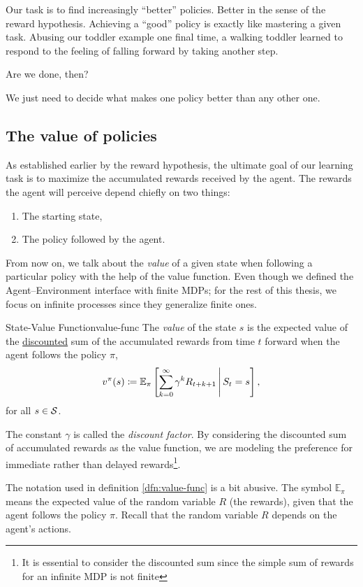 Our task is to find increasingly ``better'' policies. Better in the sense of the
reward hypothesis. Achieving a ``good'' policy is exactly like mastering a given
task. Abusing our toddler example one final time, a walking toddler learned to
respond to the feeling of falling forward by taking another step.

Are we done, then? 

We just need to decide what makes one policy better than any other one.

\subsection{The value of policies}
As established earlier by the reward hypothesis, the ultimate goal of our
learning task is to maximize the accumulated rewards received by the agent. The
rewards the agent will perceive depend chiefly on two things:
\begin{enumerate}
	\item The starting state,
	\item The policy followed by the agent.
\end{enumerate}

From now on, we talk about the \textit{value} of a given state when following a
particular policy with the help of the value function. Even though we defined
the Agent--Environment interface with finite MDPs; for the rest of this thesis,
we focus on infinite processes since they generalize finite ones.

\begin{dfn}{State-Value Function}{value-func}
	The \emph{value} of the state $s$ is the expected value of the
	\underline{discounted} sum of the accumulated rewards from time $t$ forward
	when the agent follows the policy $\pi$,
	\[
		v^{\pi} (s) \coloneqq \mathbb{E}_{\pi} \left[\sum_{k=0}^{\infty} \gamma^{k} R_{t+k+1} \,\middle\vert\, S_{t} = s\right],
	\]
	for all $s \in \mathcal{S}$.
\end{dfn}

The constant $\gamma$ is called the \textit{discount factor}. By considering the
discounted sum of accumulated rewards as the value function, we are modeling the
preference for immediate rather than delayed rewards\footnote{It is essential to
consider the discounted sum since the simple sum of rewards for an infinite MDP
is not finite}. 

The notation used in definition \ref{dfn:value-func} is a bit abusive. The
symbol $\mathbb{E}_{\pi}$ means the expected value of the random variable $R$
(the rewards), given that the agent follows the policy $\pi$. Recall that the
random variable $R$ depends on the agent's actions.


